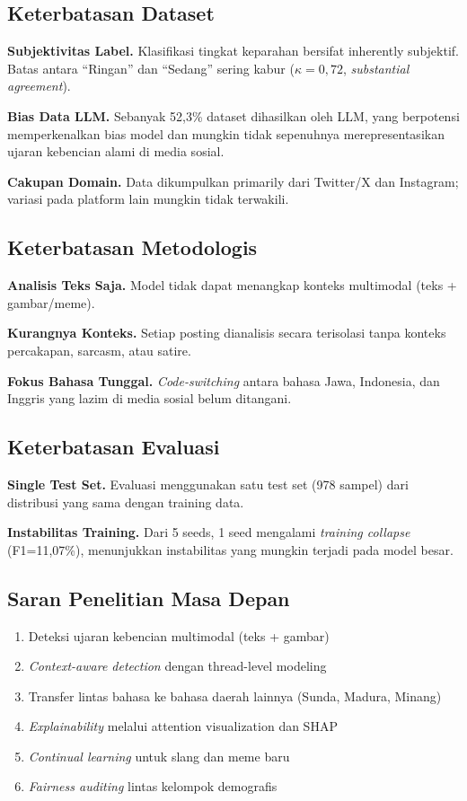\documentclass[10pt,twocolumn]{article}
\begin{document}
\subsection{Keterbatasan Dataset}

\textbf{Subjektivitas Label.} Klasifikasi tingkat keparahan bersifat inherently subjektif. Batas antara ``Ringan'' dan ``Sedang'' sering kabur ($\kappa = 0,72$, \textit{substantial agreement}).

\textbf{Bias Data LLM.} Sebanyak 52,3\% dataset dihasilkan oleh LLM, yang berpotensi memperkenalkan bias model dan mungkin tidak sepenuhnya merepresentasikan ujaran kebencian alami di media sosial.

\textbf{Cakupan Domain.} Data dikumpulkan primarily dari Twitter/X dan Instagram; variasi pada platform lain mungkin tidak terwakili.

\subsection{Keterbatasan Metodologis}

\textbf{Analisis Teks Saja.} Model tidak dapat menangkap konteks multimodal (teks + gambar/meme).

\textbf{Kurangnya Konteks.} Setiap posting dianalisis secara terisolasi tanpa konteks percakapan, sarcasm, atau satire.

\textbf{Fokus Bahasa Tunggal.} \textit{Code-switching} antara bahasa Jawa, Indonesia, dan Inggris yang lazim di media sosial belum ditangani.

\subsection{Keterbatasan Evaluasi}

\textbf{Single Test Set.} Evaluasi menggunakan satu test set (978 sampel) dari distribusi yang sama dengan training data.

\textbf{Instabilitas Training.} Dari 5 seeds, 1 seed mengalami \textit{training collapse} (F1=11,07\%), menunjukkan instabilitas yang mungkin terjadi pada model besar.

\subsection{Saran Penelitian Masa Depan}

\begin{enumerate}[leftmargin=*,nosep]
    \item Deteksi ujaran kebencian multimodal (teks + gambar)
    \item \textit{Context-aware detection} dengan thread-level modeling
    \item Transfer lintas bahasa ke bahasa daerah lainnya (Sunda, Madura, Minang)
    \item \textit{Explainability} melalui attention visualization dan SHAP
    \item \textit{Continual learning} untuk slang dan meme baru
    \item \textit{Fairness auditing} lintas kelompok demografis
\end{enumerate}
\end{document}
